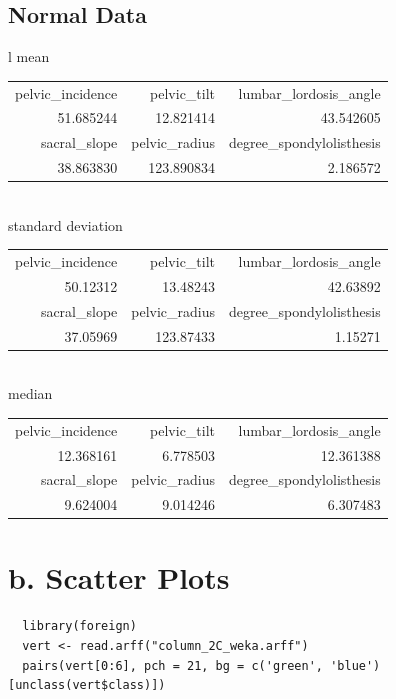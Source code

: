 \documentclass{report}
\begin{document}
\subsection{Normal Data}

\begin{tabular}{l}
  mean \\
  \hskip 1.0cm\begin{tabular}{rrr}
    pelvic\_incidence & pelvic\_tilt & lumbar\_lordosis\_angle \\
    51.685244 & 12.821414 & 43.542605 \\
    sacral\_slope & pelvic\_radius & degree\_spondylolisthesis \\
    38.863830 & 123.890834 & 2.186572 \\
  \end{tabular} \\
  standard deviation \\
  \hskip 1.0cm\begin{tabular}{rrr}
    pelvic\_incidence & pelvic\_tilt & lumbar\_lordosis\_angle \\
    50.12312 & 13.48243 & 42.63892 \\
    sacral\_slope & pelvic\_radius & degree\_spondylolisthesis \\
    37.05969 & 123.87433 & 1.15271 \\
  \end{tabular} \\
  median \\
  \hskip 1.0cm\begin{tabular}{rrr}
    pelvic\_incidence & pelvic\_tilt & lumbar\_lordosis\_angle \\
    12.368161 & 6.778503 & 12.361388 \\
    sacral\_slope & pelvic\_radius & degree\_spondylolisthesis \\
    9.624004 & 9.014246 & 6.307483 \\
  \end{tabular}
\end{tabular}

\section{b. Scatter Plots}

\begin{verbatim}
  library(foreign)
  vert <- read.arff("column_2C_weka.arff")
  pairs(vert[0:6], pch = 21, bg = c('green', 'blue')[unclass(vert$class)])
\end{verbatim}
\end{document}
